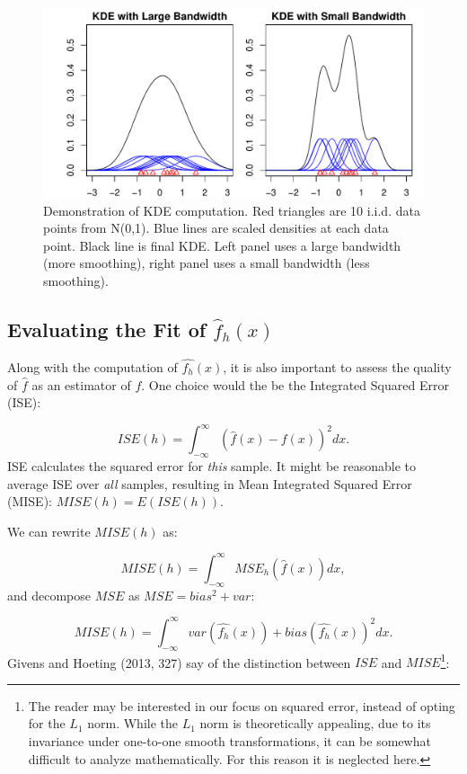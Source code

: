 \documentclass[]{article}
\let\rmarkdownfootnote\footnote%
\def\footnote{\protect\rmarkdownfootnote}
\begin{document}
\begin{figure}

{\centering \includegraphics{FinalReport_files/figure-latex/unnamed-chunk-4-1} 

}

\caption{Demonstration of KDE computation. Red triangles are 10 i.i.d. data points from N(0,1). Blue lines are scaled densities at each data point. Black line is final KDE. Left panel uses a large bandwidth (more smoothing), right panel uses a small bandwidth (less smoothing).}\label{fig:unnamed-chunk-4}
\end{figure}

\subsection{Evaluating the Fit of $\widehat{f}_h(x)$}

Along with the computation of \(\widehat{f_h}(x)\), it is also important
to assess the quality of \(\hat{f}\) as an estimator of \(f\). One
choice would the be the Integrated Squared Error (ISE):

\[ISE(h) = \int_{-\infty}^{\infty} \left(\hat{f}(x) - f(x)\right)^2dx.\]
ISE calculates the squared error for \emph{this} sample. It might be
reasonable to average ISE over \emph{all} samples, resulting in Mean
Integrated Squared Error (MISE): \(MISE(h) = E\left(ISE(h)\right).\)

We can rewrite \(MISE(h)\) as:

\[MISE(h) = \int_{-\infty}^{\infty}MSE_h\left(\hat{f}(x)\right)dx,\] and
decompose \(MSE\) as \(MSE = bias^2 + var\):

\[MISE(h) = \int_{-\infty}^{\infty} var\left(\widehat{f_h}(x)\right) + bias\left(\widehat{f_h}(x)\right)^2 dx.\]
Givens and Hoeting (2013, 327) say of the distinction between \(ISE\)
and \(MISE\)\footnote{The reader may be interested in our focus on
  squared error, instead of opting for the \(L_1\) norm. While the
  \(L_1\) norm is theoretically appealing, due to its invariance under
  one-to-one smooth transformations, it can be somewhat difficult to
  analyze mathematically. For this reason it is neglected here.}:
\end{document}
